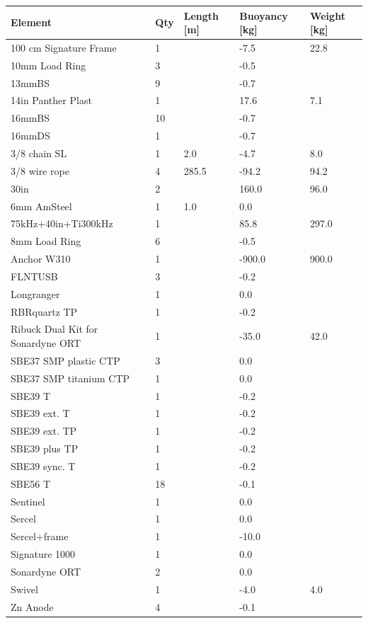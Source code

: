 \documentclass{article}
\begin{document}
\begin{tabularx}{\linewidth}{|l|l|l|l|l|}
\caption{W310 \textcolor{blue}{$\blacksquare$}: Element summary}\\
\hline
\textbf{Element} & \textbf{Qty} & \textbf{Length [m]} & \textbf{Buoyancy [kg]} & \textbf{Weight [kg]} \\
\hline
100 cm Signature Frame & 1 &  & -7.5 & 22.8 \\ \hline
10mm Load Ring & 3 &  & -0.5 &  \\ \hline
13mmBS & 9 &  & -0.7 &  \\ \hline
14in Panther Plast & 1 &  & 17.6 & 7.1 \\ \hline
16mmBS & 10 &  & -0.7 &  \\ \hline
16mmDS & 1 &  & -0.7 &  \\ \hline
3/8 chain SL & 1 & 2.0 & -4.7 & 8.0 \\ \hline
3/8 wire rope & 4 & 285.5 & -94.2 & 94.2 \\ \hline
30in & 2 &  & 160.0 & 96.0 \\ \hline
6mm AmSteel & 1 & 1.0 & 0.0 &  \\ \hline
75kHz+40in+Ti300kHz & 1 &  & 85.8 & 297.0 \\ \hline
8mm Load Ring & 6 &  & -0.5 &  \\ \hline
Anchor W310 & 1 &  & -900.0 & 900.0 \\ \hline
FLNTUSB & 3 &  & -0.2 &  \\ \hline
Longranger & 1 &  & 0.0 &  \\ \hline
RBRquartz TP & 1 &  & -0.2 &  \\ \hline
Ribuck Dual Kit for Sonardyne ORT & 1 &  & -35.0 & 42.0 \\ \hline
SBE37 SMP plastic CTP & 3 &  & 0.0 &  \\ \hline
SBE37 SMP titanium CTP & 1 &  & 0.0 &  \\ \hline
SBE39 T & 1 &  & -0.2 &  \\ \hline
SBE39 ext. T & 1 &  & -0.2 &  \\ \hline
SBE39 ext. TP & 1 &  & -0.2 &  \\ \hline
SBE39 plus TP & 1 &  & -0.2 &  \\ \hline
SBE39 sync. T & 1 &  & -0.2 &  \\ \hline
SBE56 T & 18 &  & -0.1 &  \\ \hline
Sentinel & 1 &  & 0.0 &  \\ \hline
Sercel & 1 &  & 0.0 &  \\ \hline
Sercel+frame & 1 &  & -10.0 &  \\ \hline
Signature 1000 & 1 &  & 0.0 &  \\ \hline
Sonardyne ORT & 2 &  & 0.0 &  \\ \hline
Swivel & 1 &  & -4.0 & 4.0 \\ \hline
Zn Anode & 4 &  & -0.1 &  \\ \hline
\end{tabularx}
\end{document}
